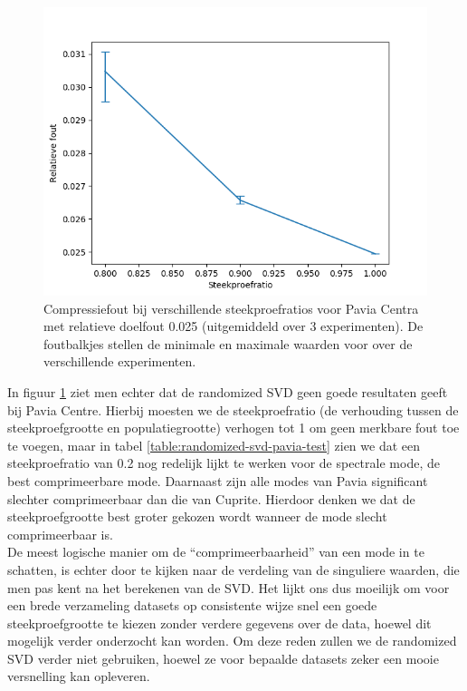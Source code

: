 \newpage
\begin{figure}[H]
  \centering
  \includegraphics[scale=0.6]{images/randomized_svd_pavia_ratios.png}
  \caption{Compressiefout bij verschillende steekproefratios voor Pavia Centra met relatieve doelfout 0.025 (uitgemiddeld over 3 experimenten). De foutbalkjes stellen de minimale en maximale waarden voor over de verschillende experimenten.}
\label{fig:randomized-svd-pavia-ratios}
\end{figure}

In figuur \ref{fig:randomized-svd-pavia-ratios} ziet men echter dat de randomized SVD geen goede resultaten geeft bij Pavia Centre. Hierbij moesten we de steekproefratio (de verhouding tussen de steekproefgrootte en populatiegrootte) verhogen tot 1 om geen merkbare fout toe te voegen, maar in tabel \ref{table:randomized-svd-pavia-test} zien we dat een steekproefratio van 0.2 nog redelijk lijkt te werken voor de spectrale mode, de best comprimeerbare mode. Daarnaast zijn alle modes van Pavia significant slechter comprimeerbaar dan die van Cuprite. Hierdoor denken we dat de steekproefgrootte best groter gekozen wordt wanneer de mode slecht comprimeerbaar is.\\

De meest logische manier om de ``comprimeerbaarheid'' van een mode in te schatten, is echter door te kijken naar de verdeling van de singuliere waarden, die men pas kent na het berekenen van de SVD. Het lijkt ons dus moeilijk om voor een brede verzameling datasets op consistente wijze snel een goede steekproefgrootte te kiezen zonder verdere gegevens over de data, hoewel dit mogelijk verder onderzocht kan worden. Om deze reden zullen we de randomized SVD verder niet gebruiken, hoewel ze voor bepaalde datasets zeker een mooie versnelling kan opleveren.


